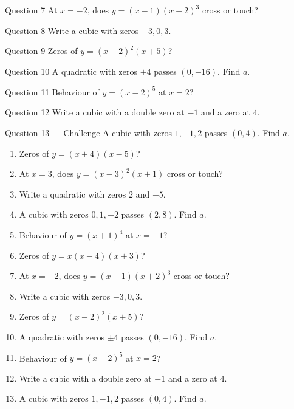 \documentclass[11pt]{article}
\begin{document}
\begin{qbox}{Question 7}
At $x=-2$, does $y=(x-1)(x+2)^3$ cross or touch?\workspace{2.4cm}
\end{qbox}

\begin{qbox}{Question 8}
Write a cubic with zeros $-3,0,3$.\workspace{2.4cm}
\end{qbox}

\begin{qbox}{Question 9}
Zeros of $y=(x-2)^2(x+5)$?\workspace{2.4cm}
\end{qbox}

\begin{qbox}{Question 10}
A quadratic with zeros $\pm4$ passes $(0,-16)$. Find $a$.\workspace{2.4cm}
\end{qbox}

\begin{qbox}{Question 11}
Behaviour of $y=(x-2)^5$ at $x=2$?\workspace{2.4cm}
\end{qbox}

\begin{qbox}{Question 12}
Write a cubic with a double zero at $-1$ and a zero at $4$.\workspace{2.4cm}
\end{qbox}

\begin{qbox}{Question 13 --- Challenge}
A cubic with zeros $1,-1,2$ passes $(0,4)$. Find $a$.\workspace{3cm}
\end{qbox}

\clearpage
{}

\begin{recapbox}
\begin{multicols}{2}
\small
\begin{enumerate}[leftmargin=*,itemsep=3pt]
  \item Zeros of $y=(x+4)(x-5)$?
  \item At $x=3$, does $y=(x-3)^2(x+1)$ cross or touch?
  \item Write a quadratic with zeros $2$ and $-5$.
  \item A cubic with zeros $0,1,-2$ passes $(2,8)$. Find $a$.
  \item Behaviour of $y=(x+1)^4$ at $x=-1$?
  \item Zeros of $y=x(x-4)(x+3)$?
  \item At $x=-2$, does $y=(x-1)(x+2)^3$ cross or touch?
  \item Write a cubic with zeros $-3,0,3$.
  \item Zeros of $y=(x-2)^2(x+5)$?
  \item A quadratic with zeros $\pm4$ passes $(0,-16)$. Find $a$.
  \item Behaviour of $y=(x-2)^5$ at $x=2$?
  \item Write a cubic with a double zero at $-1$ and a zero at $4$.
  \item A cubic with zeros $1,-1,2$ passes $(0,4)$. Find $a$.
\end{enumerate}
\end{multicols}
\end{recapbox}
\end{document}
